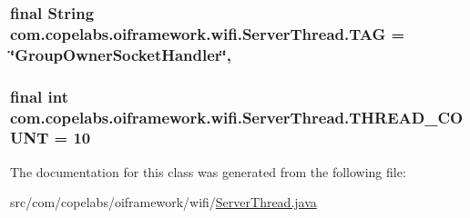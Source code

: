 \subsubsection[{T\+A\+G}]{\setlength{\rightskip}{0pt plus 5cm}final String com.\+copelabs.\+oiframework.\+wifi.\+Server\+Thread.\+T\+A\+G = \char`\"{}Group\+Owner\+Socket\+Handler\char`\"{}\hspace{0.3cm}{\ttfamily [static]}, {\ttfamily [private]}}\label{classcom_1_1copelabs_1_1oiframework_1_1wifi_1_1_server_thread_a4872e5f1e5119be44722af018a51f470}
\hypertarget{classcom_1_1copelabs_1_1oiframework_1_1wifi_1_1_server_thread_ab8508790f80a8cd728096ea45dab519f}{}
\subsubsection[{T\+H\+R\+E\+A\+D\+\_\+\+C\+O\+U\+N\+T}]{\setlength{\rightskip}{0pt plus 5cm}final int com.\+copelabs.\+oiframework.\+wifi.\+Server\+Thread.\+T\+H\+R\+E\+A\+D\+\_\+\+C\+O\+U\+N\+T = 10\hspace{0.3cm}{\ttfamily [private]}}\label{classcom_1_1copelabs_1_1oiframework_1_1wifi_1_1_server_thread_ab8508790f80a8cd728096ea45dab519f}


The documentation for this class was generated from the following file\+:\begin{DoxyCompactItemize}
\item 
src/com/copelabs/oiframework/wifi/\hyperlink{_server_thread_8java}{Server\+Thread.\+java}\end{DoxyCompactItemize}

